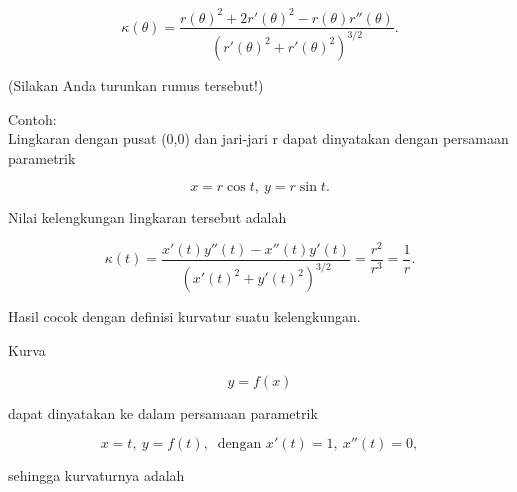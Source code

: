 \documentclass[a4paper,10pt]{article}
\begin{document}
\begin{eulernotebook}
\begin{eulercomment}
\begin{eulercomment}
\begin{eulercomment}
\begin{eulercomment}
\begin{eulercomment}
\begin{eulercomment}
\begin{eulercomment}
\begin{eulercomment}
\begin{eulercomment}
\begin{eulercomment}
\begin{eulercomment}
\begin{eulercomment}
\begin{eulercomment}
\begin{eulercomment}
\begin{eulercomment}
\begin{eulercomment}
\begin{eulercomment}
\end{eulercomment}
\begin{eulerformula}
\[
\kappa(\theta) = \frac{r(\theta)^2+2r'(\theta)^2-r(\theta)r''(\theta)}{\left(r'(\theta)^2+r'(\theta)^2\right)^{3/2}}.
\]
\end{eulerformula}
\begin{eulercomment}
(Silakan Anda turunkan rumus tersebut!)

Contoh:\\
Lingkaran dengan pusat (0,0) dan jari-jari r dapat dinyatakan dengan persamaan parametrik

\end{eulercomment}
\begin{eulerformula}
\[
x=r\cos t,\ y=r\sin t.
\]
\end{eulerformula}
\begin{eulercomment}
Nilai kelengkungan lingkaran tersebut adalah

\end{eulercomment}
\begin{eulerformula}
\[
\kappa(t)=\frac{x'(t)y''(t)-x''(t)y'(t)}{\left(x'(t)^2+y'(t)^2\right)^{3/2}}=\frac{r^2}{r^3}=\frac 1 r.
\]
\end{eulerformula}
\begin{eulercomment}
Hasil cocok dengan definisi kurvatur suatu kelengkungan.
\end{eulercomment}
\begin{eulercomment}
Kurva

\end{eulercomment}
\begin{eulerformula}
\[
y=f(x)
\]
\end{eulerformula}
\begin{eulercomment}
dapat dinyatakan ke dalam persamaan parametrik

\end{eulercomment}
\begin{eulerformula}
\[
x=t,\ y=f(t),\ \text{ dengan } x'(t)=1,\ x''(t)=0,
\]
\end{eulerformula}
\begin{eulercomment}
sehingga kurvaturnya adalah


\end{eulercomment}
\end{eulercomment}
\end{eulercomment}
\end{eulercomment}
\end{eulercomment}
\end{eulercomment}
\end{eulercomment}
\end{eulercomment}
\end{eulercomment}
\end{eulercomment}
\end{eulercomment}
\end{eulercomment}
\end{eulercomment}
\end{eulercomment}
\end{eulercomment}
\end{eulercomment}
\end{eulercomment}
\end{eulernotebook}
\end{document}
